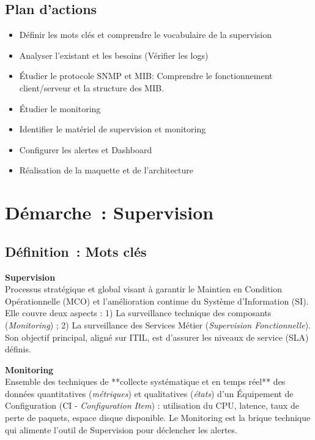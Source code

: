 \newpage

\subsection*{Plan d'actions}
{}
\begin{itemize}
	\item Définir les mots clés et comprendre le vocabulaire de la supervision
	\item Analyser l'existant et les besoins (Vérifier les logs)
	\item Étudier le protocole SNMP et MIB: Comprendre le fonctionnement client/serveur et la structure des MIB.
	\item Étudier le monitoring
	\item Identifier le matériel de supervision et monitoring 
	\item Configurer les alertes et Dashboard
	\item Réalisation de la maquette et de l'architecture
\end{itemize}

\newpage
\section*{Démarche~: Supervision}


\subsection*{Définition~: Mots clés}
{}

\noindent \textbf{Supervision} \\
Processus stratégique et global visant à garantir le Maintien en Condition Opérationnelle (MCO) et l'amélioration continue du Système d'Information (SI). Elle couvre deux aspects : 1) La surveillance technique des composants (\textit{Monitoring}) ; 2) La surveillance des Services Métier (\textit{Supervision Fonctionnelle}). Son objectif principal, aligné sur ITIL, est d'assurer les niveaux de service (SLA) définis.
\vspace{0.5em}

\noindent \textbf{Monitoring} \\
Ensemble des techniques de **collecte systématique et en temps réel** des données quantitatives (\textit{métriques}) et qualitatives (\textit{états}) d'un Équipement de Configuration (CI - \textit{Configuration Item}) : utilisation du CPU, latence, taux de perte de paquets, espace disque disponible. Le Monitoring est la brique technique qui alimente l'outil de Supervision pour déclencher les alertes.
\vspace{0.5em}

